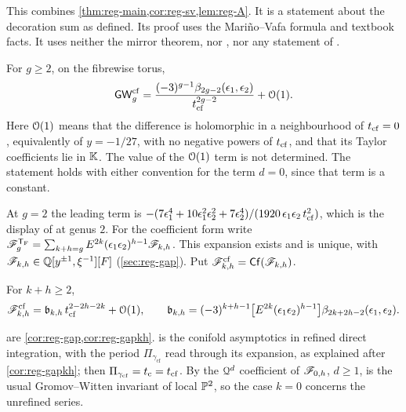 This combines \cref{thm:reg-main,cor:reg-sv,lem:reg-A}. It is a statement about the decoration sum as defined. Its proof uses the Mari\~no--Vafa formula \cite[eq.~(1)--(3)]{LLZ03} and textbook facts. It uses neither the mirror theorem, nor \cite{Tel12}, nor any statement of \cite{BS}.

\begin{cor}
\label{cor:int-gap}
For $g\geq 2$, on the fibrewise torus,
\[
\mathsf{GW}^{\mathrm{cf}}_g=\frac{(-3)^{g-1}\beta_{2g-2}(\epsilon_1,\epsilon_2)}{t_{\mathrm{cf}}^{2g-2}}+\mathcal{O}(1).
\]
Here $\mathcal{O}(1)$ means that the difference is holomorphic in a neighbourhood of $t_{\mathrm{cf}}=0$, equivalently of $y=-1/27$, with no negative powers of $t_{\mathrm{cf}}$, and that its Taylor coefficients lie in $\mathbb{K}$. The value of the $\mathcal{O}(1)$ term is not determined. The statement holds with either convention for the term $d=0$, since that term is a constant.
\end{cor}

At $g=2$ the leading term is $-(7\epsilon_1^4+10\epsilon_1^2\epsilon_2^2+7\epsilon_2^4)/(1920\,\epsilon_1\epsilon_2\,t_{\mathrm{cf}}^2)$, which is the display of \cite{BS} at genus $2$. For the coefficient form write $\mathscr{F}_g^{\mathsf{T}_{\mathrm{F}}}=\sum_{k+h=g}E^{2k}(\epsilon_1\epsilon_2)^{h-1}\mathscr{F}_{k,h}$. This expansion exists and is unique, with $\mathscr{F}_{k,h}\in\mathbb{Q}[y^{\pm1},\xi^{-1}][F]$ (\cref{sec:reg-gap}). Put $\mathscr{F}^{\mathrm{cf}}_{k,h}=\mathsf{Cf}(\mathscr{F}_{k,h})$.

\begin{cor}
\label{cor:int-gapkh}
For $k+h\geq 2$,
\[
\mathscr{F}^{\mathrm{cf}}_{k,h}=\mathfrak{b}_{k,h}\,t_{\mathrm{cf}}^{2-2h-2k}+\mathcal{O}(1),\qquad
\mathfrak{b}_{k,h}=(-3)^{k+h-1}\big[E^{2k}(\epsilon_1\epsilon_2)^{h-1}\big]\beta_{2k+2h-2}(\epsilon_1,\epsilon_2).
\]
\end{cor}

 are \cref{cor:reg-gap,cor:reg-gapkh}.  is the conifold asymptotics in refined direct integration, with the period $\Pi_{\gamma_{\mathrm{cf}}}$ read through its expansion, as explained after \cref{cor:reg-gapkh}; then $\Pi_{\gamma_{\mathrm{cf}}}=t_{\mathrm{c}}=t_{\mathrm{cf}}$. By  the $\mathcal{Q}^d$ coefficient of $\mathscr{F}_{0,h}$, $d\geq 1$, is the usual Gromov--Witten invariant of local $\mathbb{P}^2$, so the case $k=0$ concerns the unrefined series.
